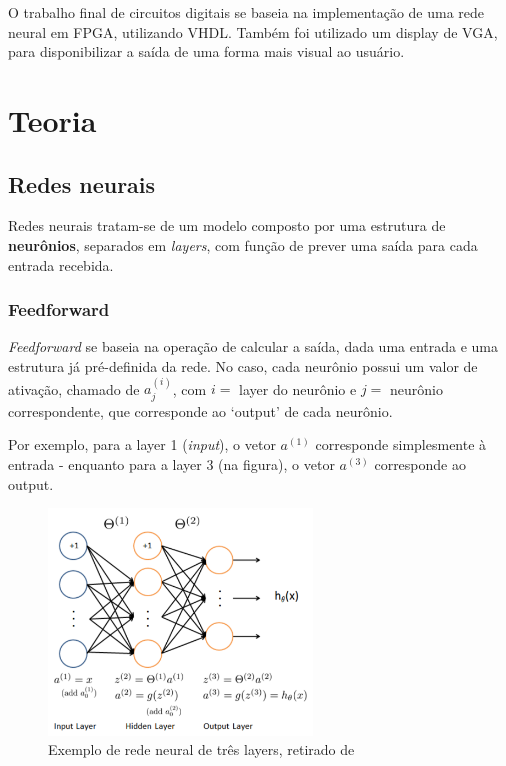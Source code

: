 O trabalho final de circuitos digitais se baseia na implementação de uma rede neural em FPGA, utilizando VHDL. Também foi utilizado um display de VGA, para disponibilizar a saída de uma forma mais visual ao usuário.

\section{Teoria} \label{sec:int}
    \subsection{Redes neurais}
        Redes neurais tratam-se de um modelo composto por uma estrutura de \textbf{neurônios}, separados em \textit{layers}, com função de prever uma saída para cada entrada recebida.

        \subsubsection{Feedforward}
            \textit{Feedforward} se baseia na operação de calcular a saída, dada uma entrada e uma estrutura já pré-definida da rede. No caso, cada neurônio possui um valor de ativação, chamado de $a^{(i)}_j$, com $i =$ layer do neurônio e $j =$ neurônio correspondente, que corresponde ao `output' de cada neurônio.

            Por exemplo, para a layer 1 (\textit{input}), o vetor $a^{(1)}$ corresponde simplesmente à entrada - enquanto para a layer 3 (na figura), o vetor $a^{(3)}$ corresponde ao output.

            \begin{figure}[ht!]
              \centering
              \includegraphics[width=7cm]{figures/nn_model}
              \caption{Exemplo de rede neural de três layers, retirado de \cite{MLC}}
              \label{fig:arch}
            \end{figure}

